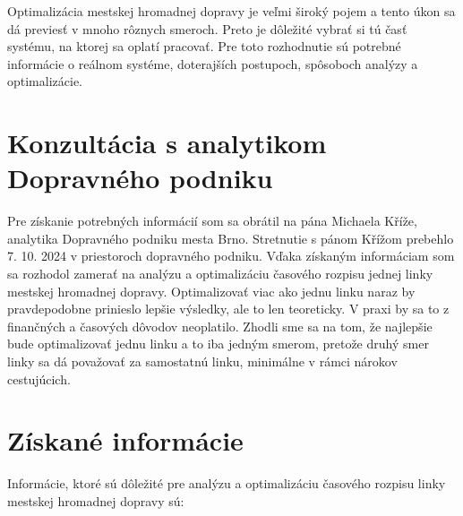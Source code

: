 Optimalizácia mestskej hromadnej dopravy je veľmi široký pojem a tento úkon sa dá previesť v mnoho rôznych smeroch.
Preto je dôležité vybrať si tú časť systému, na ktorej sa oplatí pracovať.
Pre toto rozhodnutie sú potrebné informácie o reálnom systéme, doterajších postupoch, spôsoboch analýzy a optimalizácie.

\section{Konzultácia s analytikom Dopravného podniku}
Pre získanie potrebných informácií som sa obrátil na pána Michaela Kříže, analytika Dopravného podniku mesta Brno.
Stretnutie s pánom Křížom prebehlo 7. 10. 2024 v priestoroch dopravného podniku.
Vďaka získaným informáciam som sa rozhodol zamerať na analýzu a optimalizáciu časového rozpisu jednej linky mestskej hromadnej dopravy.
Optimalizovať viac ako jednu linku naraz by pravdepodobne prinieslo lepšie výsledky, ale to len teoreticky.
V praxi by sa to z finančných a časových dôvodov neoplatilo.
Zhodli sme sa na tom, že najlepšie bude optimalizovať jednu linku a to iba jedným smerom, pretože druhý smer linky sa dá považovať za samostatnú linku, minimálne v rámci nárokov cestujúcich.

\section{Získané informácie}

Informácie, ktoré sú dôležité pre analýzu a optimalizáciu časového rozpisu linky mestskej hromadnej dopravy sú:

